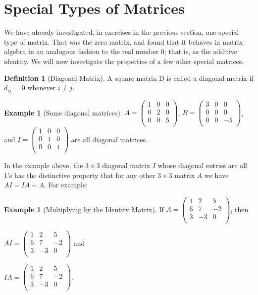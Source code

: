 \documentclass[10pt,]{book}
\theoremstyle{plain}
\theoremstyle{definition}
\newtheorem{definition}[theorem]{Definition}
\theoremstyle{definition}
\theoremstyle{definition}
\newtheorem{example}[theorem]{Example}
\theoremstyle{definition}
\begin{document}
\section[Special Types of Matrices]{Special Types of Matrices}\label{s-special-matrices}
We have already investigated, in exercises in the previous section, one special type of matrix. That was the  zero matrix, and found that it behaves in matrix algebra 
in an analogous fashion to the real number 0; that is, as the additive identity. We will now investigate the properties of a few other special matrices.%
\begin{definition}[Diagonal Matrix]\label{def-diagonal-matrix}
A square matrix D is called a diagonal matrix if \(d_{i j}\) = 0 whenever \(i \neq  j\).%
\end{definition}
\begin{example}[Some diagonal matrices]\label{example-diagonal-matrices}
   \(A = \left(
\begin{array}{ccc}
 1 & 0 & 0 \\
 0 & 2 & 0 \\
 0 & 0 & 5 \\
\end{array}
\right)\), \(B= \left(
\begin{array}{ccc}
 3 & 0 & 0 \\
 0 & 0 & 0 \\
 0 & 0 & -5 \\
\end{array}
\right)\), and \(I = \left(
\begin{array}{ccc}
 1 & 0 & 0 \\
 0 & 1 & 0 \\
 0 & 0 & 1 \\
\end{array}
\right)\) are all diagonal matrices.
%
\end{example}
\par
In the example above, the \(3\times 3\) diagonal matrix \(I\) whose diagonal entries are all 1's has the distinctive property that for any other \(3\times 3\) matrix \(A\) we have \(A I = I A = A\). For example:%
\begin{example}[Multiplying by the Identity Matrix]\label{ex-matrix-identity-product}
If \(A = \left(
\begin{array}{ccc}
 1 & 2 & 5 \\
 6 & 7 & -2 \\
 3 & -3 & 0 \\
\end{array}
\right)\), then

\(A I =\left(
\begin{array}{ccc}
 1 & 2 & 5 \\
 6 & 7 & -2 \\
 3 & -3 & 0 \\
\end{array}
\right)\) and

\(I A = \left(
\begin{array}{ccc}
 1 & 2 & 5 \\
 6 & 7 & -2 \\
 3 & -3 & 0 \\
\end{array}
\right)\).
%
\end{example}
\end{document}
